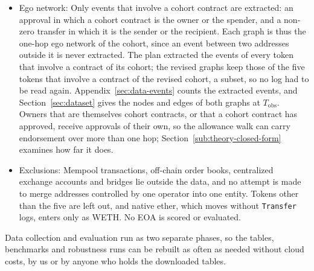 \begin{itemize}
\item Ego network: Only events that involve a cohort contract are extracted: an approval in which a cohort contract is the owner or the spender, and a non-zero transfer in which it is the sender or the recipient. Each graph is thus the one-hop ego network of the cohort, since an event between two addresses outside it is never extracted. The plan extracted the events of every token that involve a contract of its cohort; the revised graphs keep those of the five tokens that involve a contract of the revised cohort, a subset, so no log had to be read again. Appendix~\ref{sec:data-events} counts the extracted events, and Section~\ref{sec:dataset} gives the nodes and edges of both graphs at $T_{\mathrm{obs}}$. Owners that are themselves cohort contracts, or that a cohort contract has approved, receive approvals of their own, so the allowance walk can carry endorsement over more than one hop; Section~\ref{sub:theory-closed-form} examines how far it does.

\item Exclusions: Mempool transactions, off-chain order books, centralized exchange accounts and bridges lie outside the data, and no attempt is made to merge addresses controlled by one operator into one entity. Tokens other than the five are left out, and native ether, which moves without \texttt{Transfer} logs, enters only as WETH. No EOA is scored or evaluated.

\end{itemize}


Data collection and evaluation run as two separate phases, so the tables, benchmarks and robustness runs can be rebuilt as often as needed without cloud costs, by us or by anyone who holds the downloaded tables.


